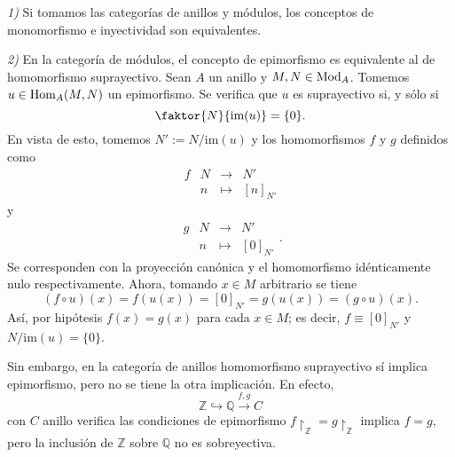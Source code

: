 \documentclass[../main.tex]{subfiles}
\begin{document}
\begin{remark}
\textit{1)} Si tomamos las categorías de anillos y módulos, los conceptos de monomorfismo e inyectividad son equivalentes.

\textit{2)} En la categoría de módulos, el concepto de epimorfismo es equivalente al de homomorfismo suprayectivo. Sean $A$ un anillo y $M,N\in\text{Mod}_A$. Tomemos $u\in\text{Hom}_A(M,N)$ un epimorfismo. Se verifica que $u$ es suprayectivo si, y sólo si $$\faktor{N}{\text{im}(u)}=\set{0}.$$
En vista de esto, tomemos $N':=N/\text{im}(u)$ y los homomorfismos $f$ y $g$ definidos como
$$\begin{array}{rrcl}
    f&N&\longrightarrow&N'\\
    &n&\longmapsto&[n]_{N'} 
\end{array}$$
y
$$\begin{array}{rrcl}
    g&N&\longrightarrow&N'\\
    &n&\longmapsto&[0]_{N'} 
\end{array}.$$
Se corresponden con la proyección canónica y el homomorfismo idénticamente nulo respectivamente. Ahora, tomando $x\in M$ arbitrario se tiene
$$(f\circ u)(x)=f(u(x))=[0]_{N'}=g(u(x))=(g\circ u)(x).$$
Así, por hipótesis $f(x)=g(x)$ para cada $x\in M$; es decir, $f\equiv[0]_{N'}$ y $N/\text{im}(u)=\{0\}$.

Sin embargo, en la categoría de anillos homomorfismo suprayectivo sí implica epimorfismo, pero no se tiene la otra implicación. En efecto, $$\mathbb{Z}\hookrightarrow \mathbb{Q}\overset{f,g}{\longrightarrow}C$$con $C$ anillo verifica las condiciones de epimorfismo $f\restriction_{\mathbb{Z}}= g\restriction_{\mathbb{Z}}$ implica $f=g$, pero la inclusión de $\mathbb{Z}$ sobre $\mathbb{Q}$ no es sobreyectiva.

\end{remark}
\end{document}
